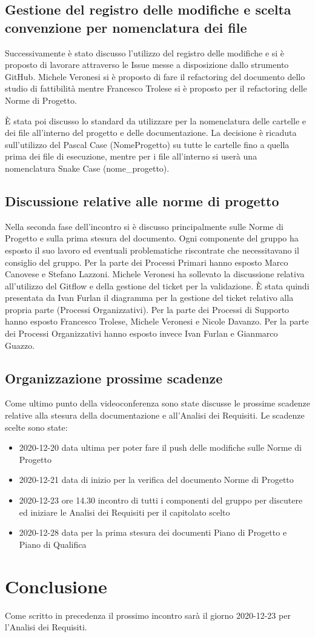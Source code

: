 \subsection{Gestione del registro delle modifiche e scelta convenzione per nomenclatura dei file}
Successivamente è stato discusso l'utilizzo del registro delle modifiche e si è proposto di lavorare attraverso le Issue messe a disposizione dallo strumento GitHub. Michele Veronesi si è proposto di fare il refactoring del documento  dello studio di fattibilità mentre Francesco Trolese si è proposto per il refactoring delle Norme di Progetto. 

È stata poi discusso lo standard da utilizzare per la nomenclatura delle cartelle e dei file all'interno del progetto e delle documentazione. La decisione è ricaduta sull'utilizzo del Pascal Case (NomeProgetto) su tutte le cartelle fino a quella prima dei file di esecuzione, mentre per i file all'interno si userà una nomenclatura Snake Case (nome\_progetto).

\subsection{Discussione relative alle norme di progetto}
Nella seconda fase dell'incontro si è discusso principalmente sulle Norme di Progetto e sulla prima stesura del documento. Ogni componente del gruppo ha esposto il suo lavoro ed eventuali problematiche riscontrate che necessitavano il consiglio del gruppo. Per la parte dei Processi Primari hanno esposto Marco Canovese e Stefano Lazzoni. Michele Veronesi ha sollevato la discussione relativa all'utilizzo del Gitflow e della gestione del ticket per la validazione. È stata quindi presentata da Ivan Furlan il diagramma per la gestione del ticket relativo alla propria parte (Processi Organizzativi). Per la parte dei Processi di Supporto hanno esposto Francesco Trolese, Michele Veronesi e Nicole Davanzo. Per la parte dei Processi Organizzativi hanno esposto invece Ivan Furlan e Gianmarco Guazzo.

\subsection{Organizzazione prossime scadenze}
Come ultimo punto della videoconferenza sono state discusse le prossime scadenze relative alla stesura della documentazione e all'Analisi dei Requisiti. Le scadenze scelte sono state:
\begin{itemize}
	\item 2020-12-20 data ultima per poter fare il push delle modifiche sulle Norme di Progetto
	\item 2020-12-21 data di inizio per la verifica del documento Norme di Progetto 
	\item 2020-12-23 ore 14.30 incontro di tutti i componenti del gruppo per discutere ed iniziare le Analisi dei Requisiti per il capitolato scelto
	\item 2020-12-28 data per la prima stesura dei documenti Piano di Progetto e Piano di Qualifica
\end{itemize}

\section{Conclusione}
Come scritto in precedenza il prossimo incontro sarà il giorno 2020-12-23 per l'Analisi dei Requisiti.
